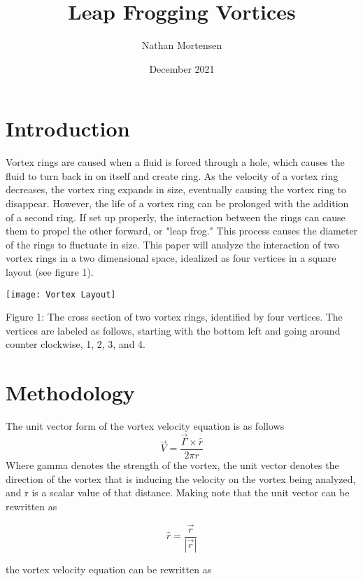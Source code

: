 \documentclass{article}
\title{Leap Frogging Vortices}
\author{Nathan Mortensen}
\date{December 2021}
\begin{document}
\maketitle
\tableofcontents
\pagebreak
\begin{multicols}{2}
\section{Introduction}

Vortex rings are caused when a fluid is forced through a hole, which causes the fluid to turn back in on itself and create ring. As the velocity of a vortex ring decreases, the vortex ring expands in size, eventually causing the vortex ring to disappear. However, the life of a vortex ring can be prolonged with the addition of a second ring. If set up properly, the interaction between the rings can cause them to propel the other forward, or "leap frog." This process causes the diameter of the rings to fluctuate in size.
This paper will analyze the interaction of two vortex rings in a two dimensional space, idealized as four vertices in a square layout (see figure 1).

\begin{center}
\texttt{[image: Vortex Layout]}

\caption{Figure 1: The cross section of two vortex rings, identified by four vertices. The vertices are labeled as follows, starting with the bottom left and going around counter clockwise, 1, 2, 3, and 4.}
\end{center}

\section{Methodology}
The unit vector form of the vortex velocity equation is as follows
\begin{equation}
   \vec{V} = \frac{\vec{\Gamma} \times \hat{r}}{2\pi r}
\end{equation}
Where gamma denotes the strength of the vortex, the unit vector denotes the direction of the vortex that is inducing the velocity on the vortex being analyzed, and r is a scalar value of that distance.
Making note that the unit vector can be rewritten as

\begin{equation}
\hat{r} = \frac{\vec{r}}{|\vec{r}|}
\end{equation}

the vortex velocity equation can be rewritten as


\end{multicols}
\end{document}
